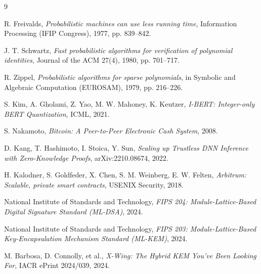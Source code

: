 \documentclass[11pt,a4paper]{article}
\begin{document}
\begin{thebibliography}{9}

 R. Freivalds, \textit{Probabilistic machines can use less running time}, Information Processing (IFIP Congress), 1977, pp. 839--842.

 J. T. Schwartz, \textit{Fast probabilistic algorithms for verification of polynomial identities}, Journal of the ACM 27(4), 1980, pp. 701--717.

 R. Zippel, \textit{Probabilistic algorithms for sparse polynomials}, in Symbolic and Algebraic Computation (EUROSAM), 1979, pp. 216--226.

 S. Kim, A. Gholami, Z. Yao, M. W. Mahoney, K. Keutzer, \textit{I-BERT: Integer-only BERT Quantization}, ICML, 2021.

 S. Nakamoto, \textit{Bitcoin: A Peer-to-Peer Electronic Cash System}, 2008.

 D. Kang, T. Hashimoto, I. Stoica, Y. Sun, \textit{Scaling up Trustless DNN Inference with Zero-Knowledge Proofs}, arXiv:2210.08674, 2022.

 H. Kalodner, S. Goldfeder, X. Chen, S. M. Weinberg, E. W. Felten, \textit{Arbitrum: Scalable, private smart contracts}, USENIX Security, 2018.

 National Institute of Standards and Technology, \textit{FIPS 204: Module-Lattice-Based Digital Signature Standard (ML-DSA)}, 2024.

 National Institute of Standards and Technology, \textit{FIPS 203: Module-Lattice-Based Key-Encapsulation Mechanism Standard (ML-KEM)}, 2024.

 M. Barbosa, D. Connolly, et al., \textit{X-Wing: The Hybrid KEM You've Been Looking For}, IACR ePrint 2024/039, 2024.

\end{thebibliography}
\end{document}

